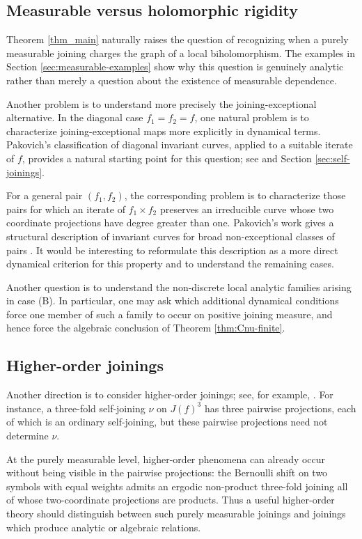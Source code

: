 \documentclass[11pt]{amsart}
\numberwithin{equation}{section}
\theoremstyle{plain}
\theoremstyle{definition}
\theoremstyle{remark}
\begin{document}
\subsection{Measurable versus holomorphic rigidity}
\label{subsec:exceptional-questions}
Theorem \ref{thm_main} naturally raises the question of recognizing
when a purely measurable joining charges the graph of a local
biholomorphism. The examples in Section \ref{sec:measurable-examples}
show why this question is genuinely analytic rather than merely a
question about the existence of measurable dependence.

Another problem is to understand more precisely the
joining-exceptional alternative.
In the diagonal case $f_1=f_2=f$, one natural problem is to characterize
joining-exceptional maps more explicitly in dynamical terms. Pakovich's
classification of diagonal invariant curves, applied to a suitable
iterate of $f$, provides a natural starting point for this question;
see \cite{PakovichInvariantCurves} and Section \ref{sec:self-joinings}.

For a general pair $(f_1,f_2)$, the corresponding problem is to
characterize those pairs for which an iterate of $f_1\times f_2$
preserves an irreducible curve whose two coordinate projections have
degree greater than one. Pakovich's work gives a structural description
of invariant curves for broad non-exceptional classes of pairs
\cite{PakovichInvariantCurves}. It would be interesting to reformulate
this description as a more direct dynamical criterion for this property
and to understand the remaining cases.

Another
question is to understand the non-discrete local analytic
families arising in case \textup{(B)}. In particular, one may ask
which additional dynamical conditions force one member of such a
family to occur on positive joining measure, and hence force the
algebraic conclusion of Theorem \ref{thm:Cnu-finite}.


\subsection{Higher-order joinings}
\label{subsec:higher-order-joinings}
Another direction is to consider higher-order joinings; see, for
example, \cite{GlasnerHostRudolph,
JanvresseDeLaRue}. For instance, a three-fold self-joining $\nu$ on
$J(f)^3$ has three pairwise projections, each of which is an ordinary
self-joining, but these pairwise projections need not determine
$\nu$.

At the purely measurable level, higher-order phenomena can already occur
without being visible in the pairwise projections: the Bernoulli shift on two symbols with equal weights
admits an ergodic non-product three-fold joining all of
whose two-coordinate projections are products. Thus a useful
higher-order theory should distinguish between such purely measurable
joinings and joinings which produce analytic or algebraic relations.
\end{document}

